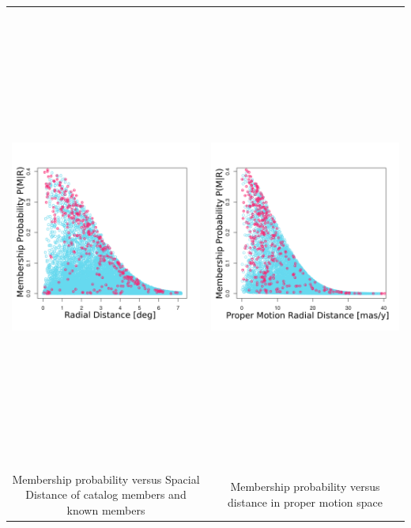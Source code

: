 \documentclass{article}
\begin{document}
\begin{tabular}{@{}c@{} @{}c@{}}
\includegraphics[height=6in,width=6in]{SpaPro}&\includegraphics[height=6in,width=6in]{ProPro}\\
\large Membership probability versus Spacial Distance of catalog members and known members& \large Membership probability versus distance in proper motion space
\end{tabular}
\end{document}
